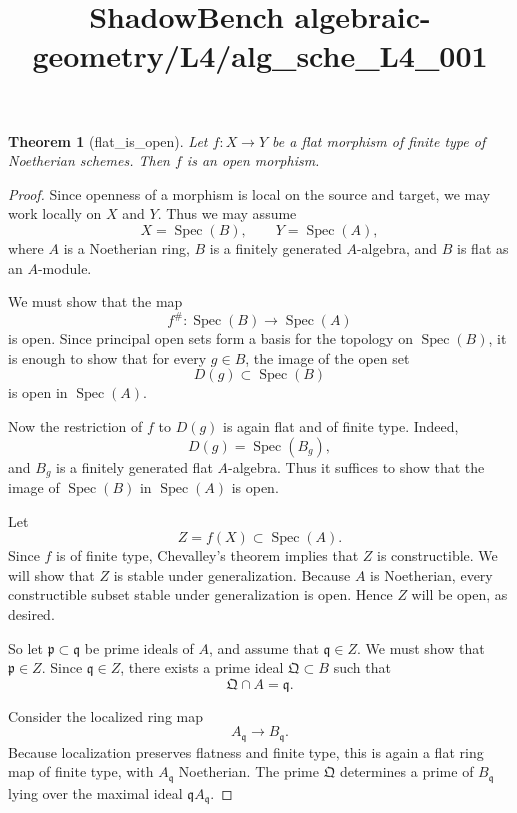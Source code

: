 \documentclass{article}
\title{ShadowBench algebraic-geometry/L4/alg\_sche\_L4\_001}
\newtheorem{theorem}{Theorem}
\begin{document}
\maketitle

\begin{theorem}[flat_is_open]
Let $f : X \to Y$ be a flat morphism of finite type of Noetherian schemes. Then $f$ is an open morphism.
\end{theorem}

\begin{proof}
Since openness of a morphism is local on the source and target, we may work locally on $X$ and $Y$. Thus we may assume
\[
X = \operatorname{Spec}(B), \qquad Y = \operatorname{Spec}(A),
\]
where $A$ is a Noetherian ring, $B$ is a finitely generated $A$-algebra, and $B$ is flat as an $A$-module.

We must show that the map
\[
f^\# : \operatorname{Spec}(B) \to \operatorname{Spec}(A)
\]
is open. Since principal open sets form a basis for the topology on $\operatorname{Spec}(B)$, it is enough to show that for every $g \in B$, the image of the open set
\[
D(g) \subset \operatorname{Spec}(B)
\]
is open in $\operatorname{Spec}(A)$.

Now the restriction of $f$ to $D(g)$ is again flat and of finite type. Indeed,
\[
D(g)=\operatorname{Spec}(B_g),
\]
and $B_g$ is a finitely generated flat $A$-algebra. Thus it suffices to show that the image of $\operatorname{Spec}(B)$ in $\operatorname{Spec}(A)$ is open.

Let
\[
Z = f(X) \subset \operatorname{Spec}(A).
\]
Since $f$ is of finite type, Chevalley's theorem implies that $Z$ is constructible. We will show that $Z$ is stable under generalization. Because $A$ is Noetherian, every constructible subset stable under generalization is open. Hence $Z$ will be open, as desired.

So let $\mathfrak p \subset \mathfrak q$ be prime ideals of $A$, and assume that $\mathfrak q \in Z$. We must show that $\mathfrak p \in Z$. Since $\mathfrak q \in Z$, there exists a prime ideal $\mathfrak Q \subset B$ such that
\[
\mathfrak Q \cap A = \mathfrak q.
\]

Consider the localized ring map
\[
A_{\mathfrak q} \to B_{\mathfrak q}.
\]
Because localization preserves flatness and finite type, this is again a flat ring map of finite type, with $A_{\mathfrak q}$ Noetherian. The prime $\mathfrak Q$ determines a prime of $B_{\mathfrak q}$ lying over the maximal ideal $\mathfrak q A_{\mathfrak q}$.


\end{proof}
\end{document}

